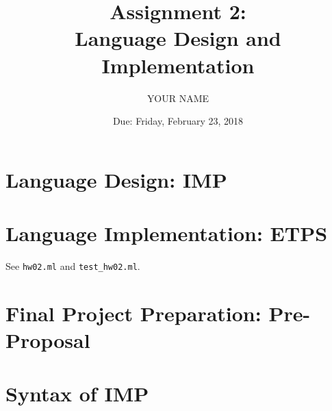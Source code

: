 \documentclass[11pt]{exam}
\title{Assignment 2: \\
       Language Design and Implementation}
\date{Due: Friday, February 23, 2018}
\author{YOUR NAME}
\newcommand{\IMP}{\textbf{\textsf{IMP}}\xspace}
\newcommand{\ETPS}{\textbf{\textsf{ETPS}}\xspace}
\begin{document}
\maketitle

\section{Language Design: \IMP}

\begin{questions}
  \question
\end{questions}

\section{Language Implementation: \ETPS}

See \texttt{hw02.ml} and \texttt{test\_hw02.ml}.

\section{Final Project Preparation: Pre-Proposal}

\begin{questions}
  \question
\end{questions}

\clearpage
\appendix

\section{Syntax of \IMP}
\end{document}
